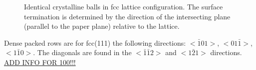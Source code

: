 \begin{figure}\centering
	\caption{Identical crystalline balls in fcc lattice configuration. The surface termination is determined by the direction of the intersecting plane (parallel to the paper plane) relative to the lattice.}
	\label{fig:crystal-termination}
\end{figure}

 Dense packed rows are for fcc(111) the following directions: $<\bar 1 01>$, $<01\bar 1>$, $<1\bar 1 0>$. The diagonals are found in the $<\bar 1 \bar 1 2>$ and $<1\bar 2 1>$ directions. \underline{ADD INFO	FOR 100!!!}
 
%

